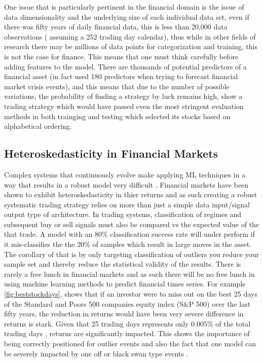 \documentclass[12pt, a4paper]{article}
\begin{document}
One issue that is particularly pertinent in the financial domain is the issue of data dimensionality and the underlying size of each individual data set, even if there was fifty years of daily financial data, this is less than 20,000 data observations ( assuming a 252 trading day calendar), thus while in other fields of research there may be millions of data points for categorization  and training, this is not the case for finance. This means that one must think carefully before adding features to the model. There are thousands of potential predictors of a financial asset (in fact \cite{Chatzis2018} used 180 predictors when trying to forecast financial market crisis events), and this means that due to the number of possible variations, the probability of finding a strategy by luck remains high, \cite{Arnott2018} show a trading strategy which would have passed even the most stringent evaluation methods in both trainging and testing which selected its stocks based on alphabetical ordering.

\subsection{Heteroskedasticity in Financial Markets}

Complex systems that continuously evolve make applying ML techniques in a way that results in a robust model very difficult \cite{Arnott2018}. Financial markets have been shown to exhibit heteroskedasticity in thier returns \cite{Corhay1996} and as such creating a robust systematic trading strategy relies on more than just a simple data input/signal output type of architecture. \newline In trading systems, classification of regimes and subsequent buy or sell signals must also be compared vs the expected value of the that trade. A model with an 80\% classification success rate will under perform if it mis-classifies the the 20\% of samples which result in large moves in the asset. The corollary of that is by only targeting classification of outliers you reduce your sample set and thereby reduce the statistical validity of the results. There is rarely a free lunch in financial markets and as such there will be no free lunch in using machine learning methods to predict financial times series. 
For example \ref{fig:beststockdays}, shows that if an investor were to miss out on the best 25 days of the Standard and Poors 500 companies equity index (S\&P 500) over the last fifty years, the reduction in returns would have been very severe \cite{bestdays} difference in returns is stark. Given that 25 trading days represents only 0.005\% of the total trading days , returns are significantly impacted. This shows the importance of being correctly positioned for outlier events and also the fact that one model can be severely impacted by one off or black swan type events \cite{Taleb}.
 
\end{document}
